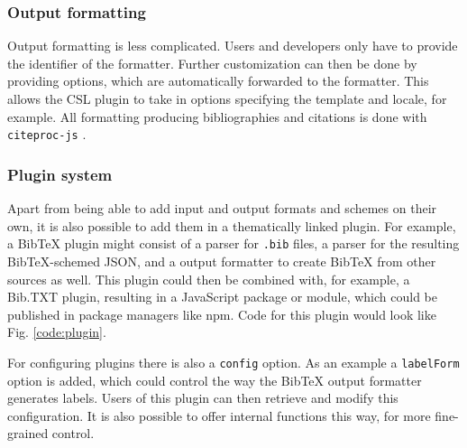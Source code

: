 \documentclass[fleqn,10pt,lineno]{wlpeerj} %
\begin{document}
\subsubsection*{Output formatting}

Output formatting is less complicated. Users and developers only have to provide the identifier of the formatter. Further customization can then be done by providing options, which are automatically forwarded to the formatter. This allows the CSL plugin to take in options specifying the template and locale, for example. All formatting producing bibliographies and citations is done with \texttt{citeproc-js} \cite{Bennett2018Juris-M/citeproc-js}.

\subsubsection*{Plugin system}

Apart from being able to add input and output formats and schemes on their own, it is also possible to add them in a thematically linked plugin. For example, a BibTeX plugin might consist of a parser for \texttt{.bib} files, a parser for the resulting BibTeX-schemed JSON, and a output formatter to create BibTeX from other sources as well. This plugin could then be combined with, for example, a Bib.TXT plugin, resulting in a JavaScript package or module, which could be published in package managers like npm. Code for this plugin would look like Fig. \ref{code:plugin}.

For configuring plugins there is also a \texttt{config} option. As an example a \texttt{labelForm} option is added, which could control the way the BibTeX output formatter generates labels. Users of this plugin can then retrieve and modify this configuration. It is also possible to offer internal functions this way, for more fine-grained control.
\end{document}
